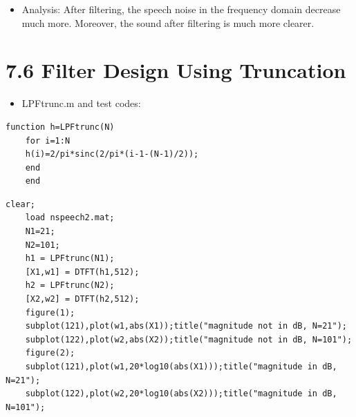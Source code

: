 \documentclass[onecolumn,oneside]{SUSTechHomework}
\begin{document}
\begin{itemize}
	\item Analysis: After filtering, the speech noise in the frequency domain decrease much more. Moreover, the sound after filtering is much more clearer.
\end{itemize}
\section*{7.6 Filter Design Using Truncation}
\begin{itemize}
	\item LPFtrunc.m and test codes:	
\end{itemize}
\begin{lstlisting}[title=LPFtrunc.m]
	function h=LPFtrunc(N)
	for i=1:N
	h(i)=2/pi*sinc(2/pi*(i-1-(N-1)/2));
	end
	end
\end{lstlisting}
\begin{lstlisting}[title=q7\_6.m]
	clear;
	load nspeech2.mat;
	N1=21;
	N2=101;
	h1 = LPFtrunc(N1);
	[X1,w1] = DTFT(h1,512);
	h2 = LPFtrunc(N2);
	[X2,w2] = DTFT(h2,512);
	figure(1);
	subplot(121),plot(w1,abs(X1));title("magnitude not in dB, N=21");
	subplot(122),plot(w2,abs(X2));title("magnitude not in dB, N=101");
	figure(2);
	subplot(121),plot(w1,20*log10(abs(X1)));title("magnitude in dB, N=21");
	subplot(122),plot(w2,20*log10(abs(X2)));title("magnitude in dB, N=101");
\end{lstlisting}
\end{document}
